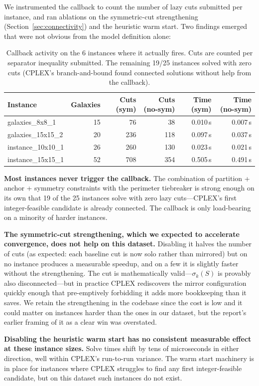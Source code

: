 We instrumented the callback to count the number of lazy cuts submitted per instance, and ran ablations on the symmetric-cut strengthening (Section~\ref{sec:connectivity}) and the heuristic warm start. Two findings emerged that were not obvious from the model definition alone:

\begin{table}[H]
  \centering
  \caption{Callback activity on the 6 instances where it actually fires. Cuts are counted per separator inequality submitted. The remaining 19/25 instances solved with zero cuts (CPLEX's branch-and-bound found connected solutions without help from the callback).}
  \label{tab:galaxies_cuts}
  \begin{tabular}{lrrrrr}
    \toprule
    Instance & Galaxies & Cuts (sym) & Cuts (no-sym) & Time (sym) & Time (no-sym) \\
    \midrule
    galaxies\_8x8\_1   & 15 & 76  & 38  & 0.010\,s & 0.007\,s \\
    galaxies\_15x15\_2 & 20 & 236 & 118 & 0.097\,s & 0.037\,s \\
    instance\_10x10\_1 & 26 & 260 & 130 & 0.023\,s & 0.021\,s \\
    instance\_15x15\_1 & 52 & 708 & 354 & 0.505\,s & 0.491\,s \\
    \bottomrule
  \end{tabular}
\end{table}

\textbf{Most instances never trigger the callback.} The combination of partition + anchor + symmetry constraints with the perimeter tiebreaker is strong enough on its own that 19 of the 25 instances solve with zero lazy cuts---CPLEX's first integer-feasible candidate is already connected. The callback is only load-bearing on a minority of harder instances.

\textbf{The symmetric-cut strengthening, which we expected to accelerate convergence, does not help on this dataset.} Disabling it halves the number of cuts (as expected: each baseline cut is now solo rather than mirrored) but on no instance produces a measurable speedup, and on a few it is slightly faster without the strengthening. The cut is mathematically valid---$\sigma_k(S)$ is provably also disconnected---but in practice CPLEX rediscovers the mirror configuration quickly enough that pre-emptively forbidding it adds more bookkeeping than it saves. We retain the strengthening in the codebase since the cost is low and it could matter on instances harder than the ones in our dataset, but the report's earlier framing of it as a clear win was overstated.

\textbf{Disabling the heuristic warm start has no consistent measurable effect at these instance sizes.} Solve times shift by tens of microseconds in either direction, well within CPLEX's run-to-run variance. The warm start machinery is in place for instances where CPLEX struggles to find any first integer-feasible candidate, but on this dataset such instances do not exist.
